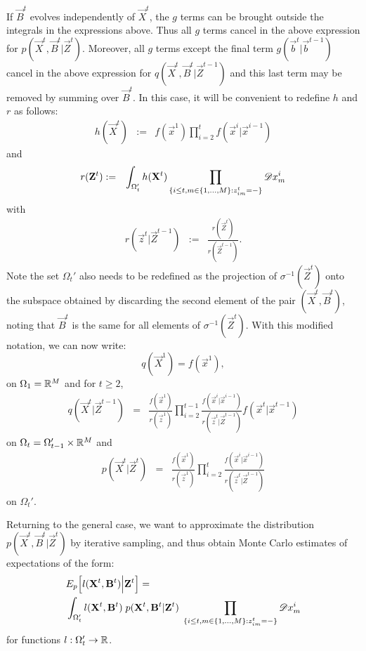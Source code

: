If $\vec{B}^t$ evolves independently of $\vec{X}^t$, the $g$ terms can be brought outside the integrals in the expressions above. Thus all $g$ terms cancel in the above expression for $p(\vec{X}^t, \vec{B}^t | \vec{Z}^t)$. Moreover, all $g$ terms except the final term $g(\vec{b}^t | \vec{b}^{t-1})$ cancel in the above expression for $q(\vec{X}^t, \vec{B}^t | \vec{Z}^{t-1})$ and this last term may be removed by summing over $\vec{B}^t$. In this case, it will be convenient to redefine $h$ and $r$ as follows:
\begin{eqnarray*}
h(\vec{X}^t) & := & f(\vec{x}^1)\prod_{i=2}^{t} f(\vec{x}^i | \vec{x}^{i-1})
\end{eqnarray*}
and
\begin{eqnarray*}
r(\mathbf{Z}^t) & := & \int_{\Omega_t'}  h(\mathbf{X}^t) \prod_{ \{ i \leq t, m \in \{1, \ldots, M \} : z^t_{im} = - \} } \mathscr{D} x^i_m
\end{eqnarray*}
with
\begin{eqnarray*}
r(\vec{z}^t | \vec{Z}^{t-1}) & := & \frac{r(\vec{Z}^t)}{r(\vec{Z}^{t-1})}.
\end{eqnarray*}
Note the set $\Omega_t'$ also needs to be redefined as the projection of $\sigma^{-1}(\vec{Z}^t)$ onto the subspace obtained by discarding the second element of the pair $(\vec{X}^t,\vec{B}^t)$, noting that $\vec{B}^t$ is the same for all elements of $\sigma^{-1}(\vec{Z}^t)$. With this modified notation, we can now write:
\[
q(\vec{X}^1) = f(\vec{x}^1),
\]
on $\Omega_1 = \mathbb R^M$ and for $t \geq 2$,
\begin{eqnarray*}
    q(\vec{X}^t | \vec{Z}^{t-1}) & = & \frac{f(\vec{x}^1)}{r(\vec{z}^1)}  \prod_{i=2}^{t-1} \frac{f(\vec{x}^i | \vec{x}^{i-1}) }{r(\vec{z}^t | \vec{Z}^{t-1})} f(\vec{x}^t | \vec{x}^{t-1})
\end{eqnarray*}
on $\Omega_t = \Omega_{t-1}' \times \mathbb R^M $ and 
\begin{eqnarray*}
    p(\vec{X}^t | \vec{Z}^t) 
& = & \frac{f(\vec{x}^1)}{r(\vec{z}^1)} \prod_{i=2}^t \frac{f(\vec{x}^i | \vec{x}^{i-1}) }{r(\vec{z}^t | \vec{Z}^{t-1})} 
\end{eqnarray*}
on $\Omega_t'$.

Returning to the general case, we want to approximate the distribution $p(\vec{X}^{t}, \vec{B}^{t} | \vec{Z}^{t})$ by iterative sampling, and thus obtain Monte Carlo estimates of expectations of the form:
\begin{align*}
    &E_{p} \Big[l(\mathbf{X}^{t}, \mathbf{B}^{t} ) \Big| \mathbf{Z}^{t} \Big] = \\
    &\int_{\Omega_t'} l(\mathbf{X}^{t}, \mathbf{B}^{t})\; p(\mathbf{X}^{t}, \mathbf{B}^{t} | \mathbf{Z}^{t})\; \prod_{ \{ i \leq t, m \in \{1, \ldots, M \} : z^t_{im} = - \} } \mathscr{D} x^i_m
\end{align*}
for functions $l: \Omega_t' \rightarrow \mathbb R$. 

